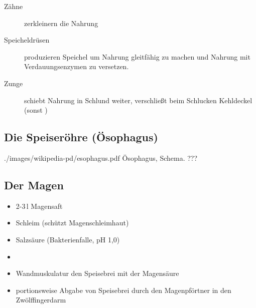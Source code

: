 \begin{description}
    \item[Zähne] zerkleinern die Nahrung
    \item[Speicheldrüsen] produzieren Speichel um Nahrung
    gleitfähig zu machen und Nahrung mit Verdauungsenzymen  zu versetzen.
    \item[Zunge] schiebt Nahrung in Schlund weiter,
    verschließt beim Schlucken Kehldeckel (sonst  )
\end{description}



\subsection{Die Speiseröhre (Ösophagus)}


{./images/wikipedia-pd/esophagus.pdf}
{Ösophagus, Schema.}
{???}





\subsection{Der Magen}



\begin{itemize}
    \item 2-3\,l Magensaft
    \item Schleim (schützt  Magenschleimhaut)
    \item Salzsäure (Bakterienfalle, pH
    1,0)
    \item {}
    \item Wandmuskulatur  den Speisebrei
    mit der Magensäure
    \item portionsweise Abgabe von Speisebrei durch den
    Magenpförtner   in
    den Zwölffingerdarm
\end{itemize}



